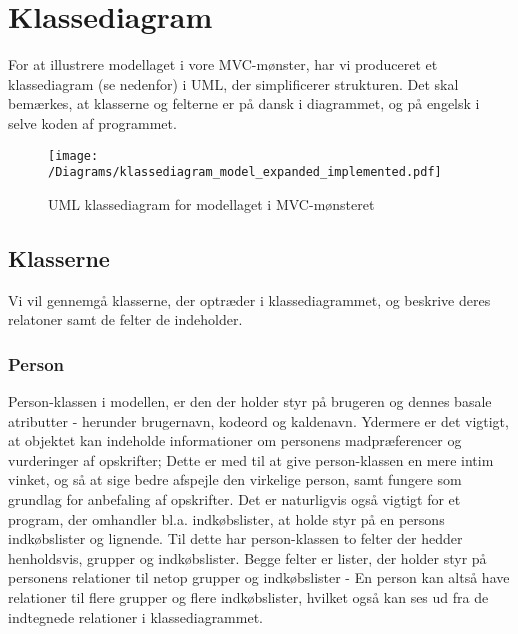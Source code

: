 \chapter{Klassediagram}
For at illustrere modellaget i vore MVC-mønster, har vi produceret et klassediagram (se  nedenfor) i UML, der simplificerer strukturen. 
Det skal bemærkes, at klasserne og felterne er på dansk i diagrammet, og på engelsk i selve koden af programmet.

\begin{figure}[H]
\centering
\texttt{[image: /Diagrams/klassediagram\_model\_expanded\_implemented.pdf]}
\caption{UML klassediagram for modellaget i MVC-mønsteret}\label{diagram:klassediagram}
\end{figure}

\section{Klasserne}
Vi vil gennemgå klasserne, der optræder i klassediagrammet, og beskrive deres relatoner samt de felter de indeholder.

\subsection{Person}
Person-klassen i modellen, er den der holder styr på brugeren og dennes basale atributter - herunder brugernavn, kodeord og kaldenavn. 
Ydermere er det vigtigt, at objektet kan indeholde informationer om personens madpræferencer og vurderinger af opskrifter; Dette er med til at give person-klassen en mere intim vinket, og så at sige bedre afspejle den virkelige person, samt fungere som grundlag for anbefaling af opskrifter. 
Det er naturligvis også vigtigt for et program, der omhandler bl.a. indkøbslister, at holde styr på en persons indkøbslister og lignende. 
Til dette har person-klassen to felter der hedder henholdsvis, grupper og indkøbslister. 
Begge felter er lister, der holder styr på personens relationer til netop grupper og indkøbslister - En person kan altså have relationer til flere grupper og flere indkøbslister, hvilket også kan ses ud fra de indtegnede relationer i klassediagrammet.

